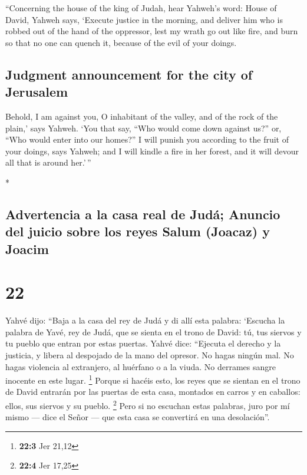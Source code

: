 \begin{paracol}{2}
\begin{otherlanguage}{english}
 ``Concerning the house of the king of Judah, hear
Yahweh's word:  House of David, Yahweh says, `Execute
justice in the morning, and deliver him who is robbed out of the hand of
the oppressor, lest my wrath go out like fire, and burn so that no one
can quench it, because of the evil of your doings.

\hypertarget{judgment-announcement-for-the-city-of-jerusalem}{%
\subsection{Judgment announcement for the city of
Jerusalem}\label{judgment-announcement-for-the-city-of-jerusalem}}

 Behold, I am against you, O inhabitant of the valley,
and of the rock of the plain,' says Yahweh. `You that say, ``Who would
come down against us?'' or, ``Who would enter into our homes?''
 I will punish you according to the fruit of your doings,
says Yahweh; and I will kindle a fire in her forest, and it will devour
all that is around her.'\,''

\end{otherlanguage}

\switchcolumn[0]*

\hypertarget{advertencia-a-la-casa-real-de-juduxe1-anuncio-del-juicio-sobre-los-reyes-salum-joacaz-y-joacim}{%
\subsection{Advertencia a la casa real de Judá; Anuncio del juicio sobre
los reyes Salum (Joacaz) y
Joacim}\label{advertencia-a-la-casa-real-de-juduxe1-anuncio-del-juicio-sobre-los-reyes-salum-joacaz-y-joacim}}

\hypertarget{section-42}{%
\section{22}\label{section-42}}

 Yahvé dijo: ``Baja a la casa del rey de Judá y di allí
esta palabra:  `Escucha la palabra de Yavé, rey de Judá,
que se sienta en el trono de David: tú, tus siervos y tu pueblo que
entran por estas puertas.  Yahvé dice: ``Ejecuta el
derecho y la justicia, y libera al despojado de la mano del opresor. No
hagas ningún mal. No hagas violencia al extranjero, al huérfano o a la
viuda. No derrames sangre inocente en este lugar. \footnote{\textbf{22:3}
  Jer 21,12}  Porque si hacéis esto, los reyes que se
sientan en el trono de David entrarán por las puertas de esta casa,
montados en carros y en caballos: ellos, sus siervos y su pueblo.
\footnote{\textbf{22:4} Jer 17,25}  Pero si no escuchan
estas palabras, juro por mí mismo --- dice el Señor --- que esta casa se
convertirá en una desolación''.


\end{paracol}

